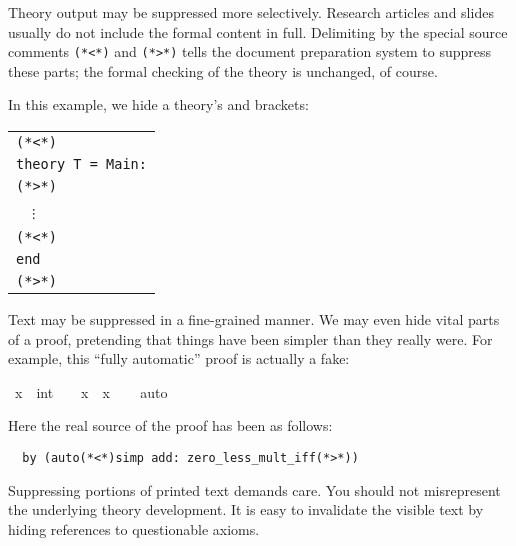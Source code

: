\begin{isabellebody}
\begin{isamarkuptext}
  \medskip Theory output may be suppressed more selectively.  Research
  articles and slides usually do not include the formal content in
  full.  Delimiting  by the special source
  comments \verb,(,\verb,*,\verb,<,\verb,*,\verb,), and
  \verb,(,\verb,*,\verb,>,\verb,*,\verb,), tells the document
  preparation system to suppress these parts; the formal checking of
  the theory is unchanged, of course.

  In this example, we hide a theory's  and
   brackets:

  \medskip

  \begin{tabular}{l}
  \verb,(,\verb,*,\verb,<,\verb,*,\verb,), \\
  \texttt{theory T = Main:} \\
  \verb,(,\verb,*,\verb,>,\verb,*,\verb,), \\
  ~~$\vdots$ \\
  \verb,(,\verb,*,\verb,<,\verb,*,\verb,), \\
  \texttt{end} \\
  \verb,(,\verb,*,\verb,>,\verb,*,\verb,), \\
  \end{tabular}

  \medskip

  Text may be suppressed in a fine-grained manner.  We may even hide
  vital parts of a proof, pretending that things have been simpler
  than they really were.  For example, this ``fully automatic'' proof
  is actually a fake:%
\end{isamarkuptext}%
\isamarkuptrue%
\ {\isachardoublequote}x\ {\isasymnoteq}\ {\isacharparenleft}{}{\isacharcolon}{\isacharcolon}int{\isacharparenright}\ {\isasymLongrightarrow}\ {}\ {\isacharless}\ x\ {\isacharasterisk}\ x{\isachardoublequote}\isanewline
\ \ \isamarkupfalse%
\ {\isacharparenleft}auto{\isacharparenright}\isamarkupfalse%
%
\begin{isamarkuptext}%
\noindent Here the real source of the proof has been as follows:

\begin{verbatim}
  by (auto(*<*)simp add: zero_less_mult_iff(*>*))
\end{verbatim}

  \medskip Suppressing portions of printed text demands care.  You
  should not misrepresent the underlying theory development.  It is
  easy to invalidate the visible text by hiding references to
  questionable axioms.


\end{isamarkuptext}
\end{isabellebody}
